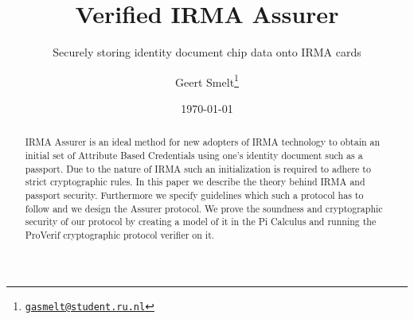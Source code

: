 \documentclass[a4paper, oneside]{scrartcl}
\author{Geert Smelt\thanks{\href{mailto:gasmelt@student.ru.nl}{\nolinkurl{gasmelt@student.ru.nl}}}}
\title{Verified IRMA Assurer}
\subtitle{Securely storing identity document chip data onto IRMA cards}
\date{\today}
\begin{document}
\maketitle

\begin{abstract}
\noindent
IRMA Assurer is an ideal method for new adopters of IRMA technology to obtain an initial set of Attribute Based Credentials using one's identity document such as a passport. Due to the nature of IRMA such an initialization is required to adhere to strict cryptographic rules. In this paper we describe the theory behind IRMA and passport security. Furthermore we specify guidelines which such a protocol has to follow and we design the Assurer protocol. We prove the soundness and cryptographic security of our protocol by creating a model of it in the Pi Calculus and running the ProVerif cryptographic protocol verifier on it.
\end{abstract}








\nocite{*}



\clearpage
\appendix


\end{document}
